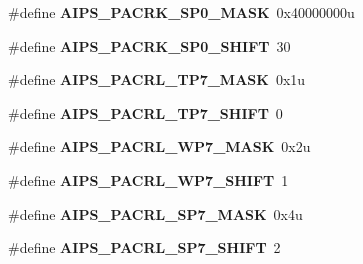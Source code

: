 \begin{DoxyCompactItemize}
\item 
\hypertarget{group___a_i_p_s___register___masks_ga25e1f66e3bdfb5f67acc221d1e9d8ebb}{}\#define {\bfseries A\+I\+P\+S\+\_\+\+P\+A\+C\+R\+K\+\_\+\+S\+P0\+\_\+\+M\+A\+S\+K}~0x40000000u\label{group___a_i_p_s___register___masks_ga25e1f66e3bdfb5f67acc221d1e9d8ebb}

\item 
\hypertarget{group___a_i_p_s___register___masks_gae656b1ce173fb026b6a4318795612c2c}{}\#define {\bfseries A\+I\+P\+S\+\_\+\+P\+A\+C\+R\+K\+\_\+\+S\+P0\+\_\+\+S\+H\+I\+F\+T}~30\label{group___a_i_p_s___register___masks_gae656b1ce173fb026b6a4318795612c2c}

\item 
\hypertarget{group___a_i_p_s___register___masks_gaad8600c1f3d8c788e50c3156d1000917}{}\#define {\bfseries A\+I\+P\+S\+\_\+\+P\+A\+C\+R\+L\+\_\+\+T\+P7\+\_\+\+M\+A\+S\+K}~0x1u\label{group___a_i_p_s___register___masks_gaad8600c1f3d8c788e50c3156d1000917}

\item 
\hypertarget{group___a_i_p_s___register___masks_ga800d08dab0f51ed296a0b0735e2e4d66}{}\#define {\bfseries A\+I\+P\+S\+\_\+\+P\+A\+C\+R\+L\+\_\+\+T\+P7\+\_\+\+S\+H\+I\+F\+T}~0\label{group___a_i_p_s___register___masks_ga800d08dab0f51ed296a0b0735e2e4d66}

\item 
\hypertarget{group___a_i_p_s___register___masks_gabe1bc072057ede25a7903dace778da5a}{}\#define {\bfseries A\+I\+P\+S\+\_\+\+P\+A\+C\+R\+L\+\_\+\+W\+P7\+\_\+\+M\+A\+S\+K}~0x2u\label{group___a_i_p_s___register___masks_gabe1bc072057ede25a7903dace778da5a}

\item 
\hypertarget{group___a_i_p_s___register___masks_gaadcbaf86fc011273154bf17772911bea}{}\#define {\bfseries A\+I\+P\+S\+\_\+\+P\+A\+C\+R\+L\+\_\+\+W\+P7\+\_\+\+S\+H\+I\+F\+T}~1\label{group___a_i_p_s___register___masks_gaadcbaf86fc011273154bf17772911bea}

\item 
\hypertarget{group___a_i_p_s___register___masks_ga2149c97089452989dad4f2c95d761910}{}\#define {\bfseries A\+I\+P\+S\+\_\+\+P\+A\+C\+R\+L\+\_\+\+S\+P7\+\_\+\+M\+A\+S\+K}~0x4u\label{group___a_i_p_s___register___masks_ga2149c97089452989dad4f2c95d761910}

\item 
\hypertarget{group___a_i_p_s___register___masks_ga721bab7d999f3374ada830d34a39721f}{}\#define {\bfseries A\+I\+P\+S\+\_\+\+P\+A\+C\+R\+L\+\_\+\+S\+P7\+\_\+\+S\+H\+I\+F\+T}~2\label{group___a_i_p_s___register___masks_ga721bab7d999f3374ada830d34a39721f}


\end{DoxyCompactItemize}
